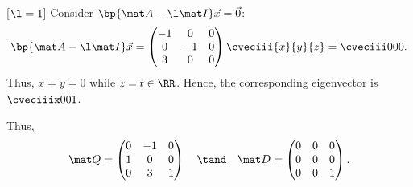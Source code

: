 \begin{solution}
\begin{ppart}
        [$\l = 1$] Consider $\bp{\mat A - \l \mat I} \vec x = \vec 0$: \[\bp{\mat A - \l \mat I} \vec x = \begin{pmatrix}-1 & 0 & 0 \\ 0 & -1 & 0 \\ 3 & 0 & 0\end{pmatrix}\cveciii{x}{y}{z} = \cveciii000.\] Thus, $x = y = 0$ while $z = t \in \RR$. Hence, the corresponding eigenvector is $\cveciiix001$.

        Thus, \[\mat Q = \begin{pmatrix}0 & -1 & 0 \\ 1 & 0 & 0 \\ 0 & 3 & 1\end{pmatrix} \quad \tand \quad \mat D = \begin{pmatrix}0 & 0 & 0 \\ 0 & 0 & 0 \\ 0 & 0 & 1\end{pmatrix}.\]
    \end{ppart}
\end{solution}

